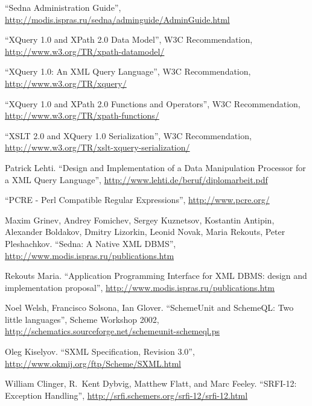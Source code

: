 \documentclass[a4paper,12pt]{article}
\begin{document}
\newpage

\begin{thebibliography}{9}
``Sedna Administration Guide'',
\url{http://modis.ispras.ru/sedna/adminguide/AdminGuide.html}

``XQuery 1.0 and XPath 2.0 Data Model'', W3C Recommendation,
\url{http://www.w3.org/TR/xpath-datamodel/}

``XQuery 1.0: An XML Query Language'', W3C Recommendation,
\url{http://www.w3.org/TR/xquery/}

``XQuery 1.0 and XPath 2.0 Functions and Operators'', W3C Recommendation,
\url{http://www.w3.org/TR/xpath-functions/}

``XSLT 2.0 and XQuery 1.0 Serialization'', W3C Recommendation,
\url{http://www.w3.org/TR/xslt-xquery-serialization/}

 Patrick Lehti.
``Design and Implementation of a Data Manipulation Processor for a XML Query
Language'',
\url{http://www.lehti.de/beruf/diplomarbeit.pdf}

``PCRE - Perl Compatible Regular Expressions'',
\url{http://www.pcre.org/}

Maxim Grinev, Andrey Fomichev, Sergey Kuznetsov, Kostantin Antipin, Alexander
Boldakov, Dmitry Lizorkin, Leonid Novak, Maria Rekouts, Peter Pleshachkov.
``Sedna: A Native XML DBMS'',
\url{http://www.modis.ispras.ru/publications.htm}

 Rekouts Maria.
``Application Programming Interface for XML DBMS: design and implementation
proposal'',
\url{http://www.modis.ispras.ru/publications.htm}

Noel Welsh, Francisco Solsona, Ian Glover.
``SchemeUnit and SchemeQL: Two little languages'',
Scheme Workshop 2002,
\url{http://schematics.sourceforge.net/schemeunit-schemeql.ps}

Oleg Kiselyov.
``SXML Specification, Revision 3.0'',
\url{http://www.okmij.org/ftp/Scheme/SXML.html}

William Clinger, R.\ Kent Dybvig, Matthew Flatt, and Marc Feeley.
``SRFI-12: Exception Handling'',
\url{http://srfi.schemers.org/srfi-12/srfi-12.html}


\end{thebibliography}
\end{document}
